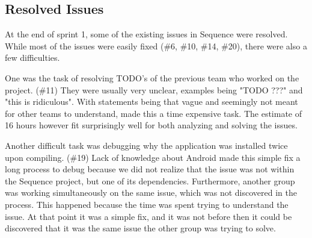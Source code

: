 \subsection{Resolved Issues} \label{subsec:spr1_resolved_issues}
At the end of sprint 1, some of the existing issues in Sequence were resolved.
While most of the issues were easily fixed (\#6, \#10, \#14, \#20), there were also a few difficulties.

One was the task of resolving TODO's of the previous team who worked on the project. (\#11) They were usually very unclear, examples being "TODO ???" and "this is ridiculous". With statements being that vague and seemingly not meant for other teams to understand, made this a time expensive task. The estimate of 16 hours however fit surprisingly well for both analyzing and solving the issues. 

Another difficult task was debugging why the application was installed twice upon compiling. (\#19) Lack of knowledge about Android made this simple fix a long process to debug because we did not realize that the issue was not within the Sequence project, but one of its dependencies. Furthermore, another group was working simultaneously on the same issue, which was not discovered in the process. This happened because the time was spent trying to understand the issue. At that point it was a simple fix, and it was not before then it could be discovered that it was the same issue the other group was trying to solve.